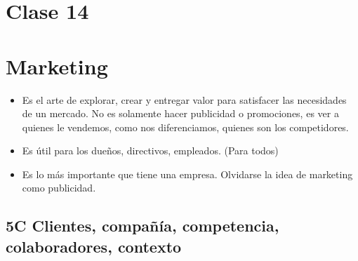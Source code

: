 \documentclass[titlepage,a4paper]{article}
\begin{document}



\newpage
\section*{Clase 14}
\section{Marketing}
\begin{itemize}
\item Es el arte de explorar, crear y entregar valor para satisfacer las necesidades de un mercado. No es solamente hacer publicidad o promociones, es ver a quienes le vendemos, como nos diferenciamos, quienes son los competidores.
\item Es útil para los dueños, directivos, empleados. (Para todos)
\item Es lo más importante que tiene una empresa. Olvidarse la idea de marketing como publicidad.
\end{itemize}


\subsection{5C Clientes, compañía, competencia, colaboradores, contexto}
\end{document}
